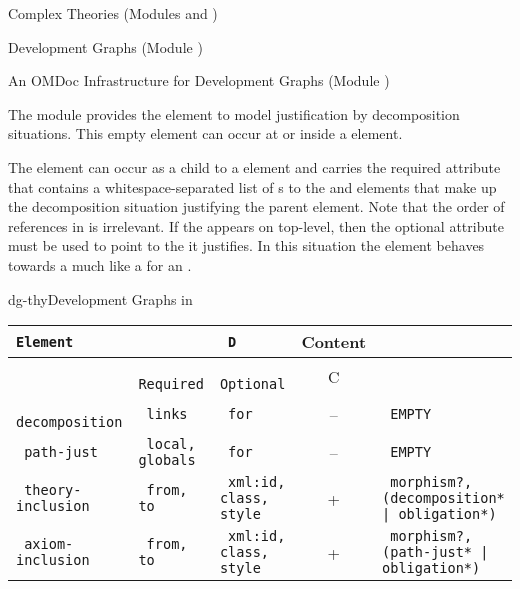 \begin{tchapter}[id=complex-theories,short=Complex Theories]{Complex Theories (Modules
    {} and {})}
\begin{tsection}[id=development-graphs,short=Development Graphs]{Development Graphs
    (Module {})}
\begin{tsubsection}[id=dg-omdoc,short=OMDoc Development Graphs]{An OMDoc Infrastructure
    for Development Graphs (Module {})}
  
  The {} module provides the {} element to model
  justification by decomposition situations.  This empty element can occur at
  {} or inside a {} element.
 
  The {} element can occur as a child to a
  {} element and carries the required attribute
  {} that contains a whitespace-separated list of
  {s} to the {} and {}
  elements that make up the decomposition situation justifying the parent
  {} element. Note that the order of references in
  {} is irrelevant. If the {}
  appears on top-level, then the optional {} attribute must
  be used to point to the {} it justifies. In this situation the
  {} element behaves towards a {} much
  like a {} for an {}.

\begin{myfig}{dg-thy}{Development Graphs in {\omdoc}}
\begin{scriptsize}
\begin{tabular}{|>{\tt}l|>{\tt}p{}|>{\tt}p{}|c|>{\tt}p{}|}\hline
{\rm Element}& \multicolumn{2}{l|}{Attributes} & D & Content  \\\hline
             & {\rm Required} & {\rm Optional}     & C &           \\\hline\hline
 decomposition  & links       & for                & -- & EMPTY\\\hline
 path-just   & local, globals & for                & -- & EMPTY\\\hline
 theory-inclusion & from, to  & xml:id, class, style & +  & morphism?, (decomposition* | obligation*)\\\hline
 axiom-inclusion  & from, to  & xml:id, class, style & +  & morphism?, (path-just* | obligation*)\\\hline
\end{tabular}
\end{scriptsize}
\end{myfig}


\end{tsubsection}
\end{tsection}
\end{tchapter}
